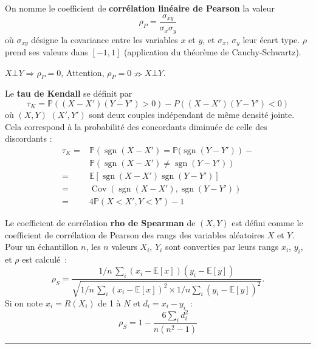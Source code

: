 \begin{f}

On nomme le coefficient de \textbf{corrélation linéaire de Pearson} la valeur
\[
\rho_P = \frac{\sigma_{xy}}{\sigma_x \sigma_y}
\]
où \(\sigma_{xy}\) désigne la covariance entre les variables \(x\) et \(y\), et \(\sigma_x\), \(\sigma_y\) leur écart type.
\(\rho\) prend ses valeurs dans \([-1,1]\) (application du théorème de Cauchy-Schwartz).

\(X\bot Y \Rightarrow \rho_P=0\), Attention, \(\rho_P=0 \nRightarrow X\bot Y \). 


 

Le \textbf{tau de Kendall} se définit par
\[
\tau_K=\mathbb{P}((X-X')(Y-Y')>0)-P((X-X')(Y-Y')<0)
\]
où \((X,Y)\)  \((X',Y')\)  sont deux couples indépendant de même densité jointe. Cela correspond à  la probabilité des concordants diminuée de celle des discordants :
\begin{align*}
\tau_K	=&\mathbb{P}\left(\operatorname{sgn}(X-X')=\mathbb{P}(\operatorname{sgn}(Y-Y')\right)-\\
		&\mathbb{P}\left(\operatorname{sgn}(X-X')\neq \operatorname{sgn}(Y-Y')\right)\\
=&\mathbb{E}\left[ \operatorname{sgn}(X-X')\operatorname{sgn}(Y-Y')\right]\\
=&\operatorname{Cov}(\operatorname{sgn}(X-X'),\operatorname{sgn}(Y-Y'))\\
=&4\mathbb{P}(X<X',Y<Y')-1 
\end{align*}

Le coefficient de corrélation \textbf{rho de Spearman} de \((X,Y)\) est défini comme le coefficient de corrélation de Pearson des rangs des variables aléatoires \(X\) et \(Y\).
Pour un échantillon \(n\), les \(n\) valeurs \(X_i\), \(Y_i\) sont converties par leurs rangs \(x_i\), \(y_i\), et \(\rho\) est calculé~:
\[
\rho_S = \frac{1/n\,\sum_i(x_i-\mathbb{E}[x])(y_i-\mathbb{E}[y])}{\sqrt{1/n\,\sum_i (x_i-\mathbb{E}[x])^2 \times 1/n\sum_i(y_i-\mathbb{E}[y])^2}}.
\]
Si on note \(x_i= R(X_i)\) de 1 à \(N\) et  \(d_i = x_i - y_i\)~:
\[    \rho_S = 1- {\frac {6 \sum_i d_i^2}{n(n^2 - 1)}}\]

\end{f}
\hrule

